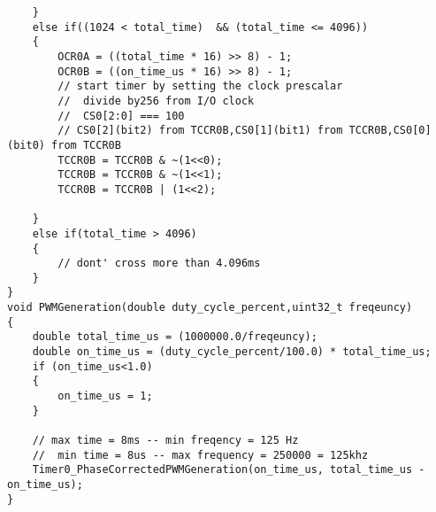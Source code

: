 \begin{verbatim}
	}
	else if((1024 < total_time)  && (total_time <= 4096))
	{
		OCR0A = ((total_time * 16) >> 8) - 1;
		OCR0B = ((on_time_us * 16) >> 8) - 1;
		// start timer by setting the clock prescalar
		//  divide by256 from I/O clock
		//  CS0[2:0] === 100
		// CS0[2](bit2) from TCCR0B,CS0[1](bit1) from TCCR0B,CS0[0](bit0) from TCCR0B
		TCCR0B = TCCR0B & ~(1<<0);
		TCCR0B = TCCR0B & ~(1<<1);
		TCCR0B = TCCR0B | (1<<2);
		
	}
	else if(total_time > 4096)
	{
		// dont' cross more than 4.096ms
	}
}
void PWMGeneration(double duty_cycle_percent,uint32_t freqeuncy)
{
	double total_time_us = (1000000.0/freqeuncy);	
	double on_time_us = (duty_cycle_percent/100.0) * total_time_us;
	if (on_time_us<1.0)
	{
		on_time_us = 1;
	}
	
	// max time = 8ms -- min freqency = 125 Hz
	//  min time = 8us -- max frequency = 250000 = 125khz
	Timer0_PhaseCorrectedPWMGeneration(on_time_us, total_time_us - on_time_us);
}
\end{verbatim}



% 